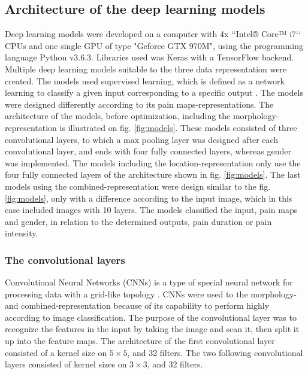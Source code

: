\subsection*{\textbf{Architecture of the deep learning models}}
Deep learning models were developed on a computer with 4x ‘‘Intel® Core™ i7‘‘ CPUs and one single GPU of type "Geforce GTX 970M", using the programming language Python v3.6.3. Libraries used was Keras with a TensorFlow backend. \newline
\noindent
Multiple deep learning models suitable to the three data representation were created. The models used supervised learning, which is defined as a network learning to classify a given input corresponding to a specific output \citep{Goodfellow2016}. The models were designed differently according to its pain maps-representations. The architecture of the models, before  optimization, including the morphology-representation is illustrated on fig. \ref{fig:models}. These models consisted of  three convolutional layers, to which a max pooling layer was designed after each convolutional layer, and ends with four fully connected layers, whereas gender was implemented. The models including the location-representation only use the four fully connected layers of the architecture shown in fig. \ref{fig:models}. The last models using the combined-representation were design similar to the fig. \ref{fig:models}, only with a difference according to the input image, which in this case included images with 10 layers. The models classified the input, pain maps and gender, in relation to the determined outputs, pain duration or pain intensity.

\subsubsection*{\textbf{The convolutional layers}}
Convolutional Neural Networks (CNNs) is a type of special neural network for processing data with a grid-like topology \citep{Goodfellow2016}. CNNs were used to the morphology- and combined-representation because of its capability to perform highly according to image classification. The purpose of the convolutional layer was to recognize the features in the input by taking the image and scan it, then split it up into the feature maps.\citep{Goodfellow2016,LeCun1998} The architecture of the first convolutional layer consisted of a kernel size on $5 \times 5$, and 32 filters. The two following convolutional layers consisted of kernel sizes on $3 \times 3$, and 32 filters. 


